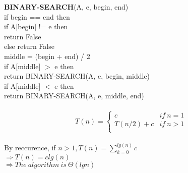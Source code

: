 \documentclass{article}
\begin{document}
\noindent\textbf{BINARY-SEARCH}(A, e, begin, end)\\
\indent if begin == end then\\
\indent \indent if A[begin] != e then \\
\indent \indent \indent return False\\
\indent \indent else return False\\
\indent middle = (begin + end) / 2\\
\indent if A[middle] $>$ e then \\
\indent \indent \indent return BINARY-SEARCH(A, e, begin, middle)\\
\indent if A[middle] $<$ e then\\
\indent \indent \indent return BINARY-SEARCH(A, e, middle, end)\\\\
\begin{equation}
T(n) =
\begin{cases} c &if \ n = 1\\
  T(n/2)  + c &if \ n > 1\\
\end{cases}
\end{equation}\\
\noindent By reccurence, if $n > 1, T(n) = \sum_{k=0}^{lg(n)}c$\\
$\Rightarrow T(n) = clg(n)$\\
$\Rightarrow The \ algorithm \ is \ \Theta(lgn)$
\end{document}
